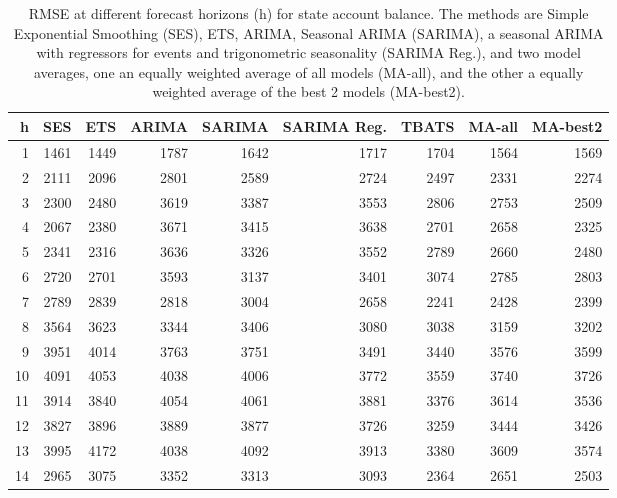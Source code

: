 \begin{table}[ht]
\centering
\begin{tabular}{rrrrrrrrr}
  \hline
h & SES & ETS & ARIMA & SARIMA & SARIMA Reg. & TBATS & MA-all & MA-best2 \\ 
  \hline
1 & 1461 & 1449 & 1787 & 1642 & 1717 & 1704 & 1564 & 1569 \\ 
  2 & 2111 & 2096 & 2801 & 2589 & 2724 & 2497 & 2331 & 2274 \\ 
  3 & 2300 & 2480 & 3619 & 3387 & 3553 & 2806 & 2753 & 2509 \\ 
  4 & 2067 & 2380 & 3671 & 3415 & 3638 & 2701 & 2658 & 2325 \\ 
  5 & 2341 & 2316 & 3636 & 3326 & 3552 & 2789 & 2660 & 2480 \\ 
  6 & 2720 & 2701 & 3593 & 3137 & 3401 & 3074 & 2785 & 2803 \\ 
  7 & 2789 & 2839 & 2818 & 3004 & 2658 & 2241 & 2428 & 2399 \\ 
  8 & 3564 & 3623 & 3344 & 3406 & 3080 & 3038 & 3159 & 3202 \\ 
  9 & 3951 & 4014 & 3763 & 3751 & 3491 & 3440 & 3576 & 3599 \\ 
  10 & 4091 & 4053 & 4038 & 4006 & 3772 & 3559 & 3740 & 3726 \\ 
  11 & 3914 & 3840 & 4054 & 4061 & 3881 & 3376 & 3614 & 3536 \\ 
  12 & 3827 & 3896 & 3889 & 3877 & 3726 & 3259 & 3444 & 3426 \\ 
  13 & 3995 & 4172 & 4038 & 4092 & 3913 & 3380 & 3609 & 3574 \\ 
  14 & 2965 & 3075 & 3352 & 3313 & 3093 & 2364 & 2651 & 2503 \\ 
   \hline
\end{tabular}
\caption{RMSE at different forecast horizons (h) for state account balance. The methods are Simple Exponential Smoothing (SES), ETS, ARIMA, Seasonal ARIMA (SARIMA), a seasonal ARIMA with regressors for events and trigonometric seasonality (SARIMA Reg.), and two model averages, one an equally weighted average of all models (MA-all), and the other a equally weighted average of the best 2 models (MA-best2).} 
\label{tab:rmsesab}
\end{table}

